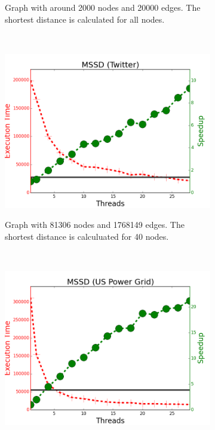 \begin{figure}[]
\begin{subfigure}[b]{\plotsize\textwidth}
                \caption{Graph with around 2000 nodes and 20000 edges. The shortest
                   distance is calculated for all nodes.}
        \end{subfigure} \\
        \begin{subfigure}[b]{\plotsize\textwidth}
                \includegraphics[width=\textwidth]{experiments/scalability/scale-shortest-twitter.png}
                \label{fig:implementation:scale_sssp_twitter}
                \caption{Graph with 81306 nodes and 1768149 edges. The shortest
                   distance is calculuated for 40 nodes.}
        \end{subfigure}
        ~
        \begin{subfigure}[b]{\plotsize\textwidth}
                \includegraphics[width=\textwidth]{experiments/scalability/scale-shortest-uspowergrid.png}

\end{subfigure}
\end{figure}
